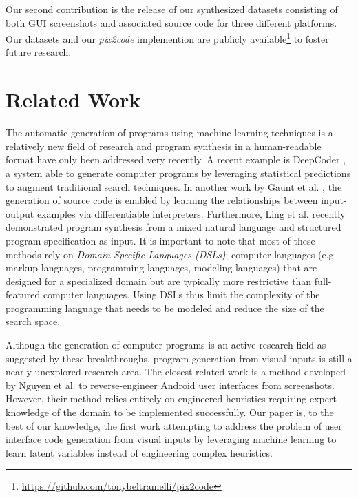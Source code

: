 \documentclass{article}
\begin{document}
Our second contribution is the release of our synthesized datasets consisting of both GUI screenshots and associated source code for three different platforms. Our datasets and our \emph{pix2code} implemention are publicly available\footnote{\url{https://github.com/tonybeltramelli/pix2code}} to foster future research.


\section{Related Work}

The automatic generation of programs using machine learning techniques is a relatively new field of research and program synthesis in a human-readable format have only been addressed very recently. A recent example is DeepCoder \cite{balog2016deepcoder}, a system able to generate computer programs by leveraging statistical predictions to augment traditional search techniques. In another work by Gaunt et al. \cite{gaunt2016terpret}, the generation of source code is enabled by learning the relationships between input-output examples via differentiable interpreters. Furthermore, Ling et al. \cite{ling2016latent} recently demonstrated program synthesis from a mixed natural language and structured program specification as input. It is important to note that most of these methods rely on \emph{Domain Specific Languages (DSLs)}; computer languages (e.g. markup languages, programming languages, modeling languages) that are designed for a specialized domain but are typically more restrictive than full-featured computer languages. Using DSLs thus limit the complexity of the programming language that needs to be modeled and reduce the size of the search space.

Although the generation of computer programs is an active research field as suggested by these breakthroughs, program generation from visual inputs is still a nearly unexplored research area. The closest related work is a method developed by Nguyen et al. \cite{nguyen2015reverse} to reverse-engineer Android user interfaces from screenshots. However, their method relies entirely on engineered heuristics requiring expert knowledge of the domain to be implemented successfully. Our paper is, to the best of our knowledge, the first work attempting to address the problem of user interface code generation from visual inputs by leveraging machine learning to learn latent variables instead of engineering complex heuristics.
\end{document}
